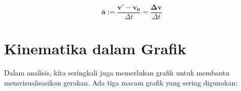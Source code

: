 \documentclass[12pt, a4paper]{article}\usepackage[utf8]{inputenc}
\theoremstyle{plain}
\theoremstyle{plain}
\numberwithin{equation}{section}
\theoremstyle{definition}
\begin{document}
	\begin{equation}
		\boldsymbol{\overline{a}} := \frac{\boldsymbol{v'} - \boldsymbol{v_0}}{\Delta t} = \frac{\boldsymbol{\Delta v}}{\Delta t}
	\end{equation}
	
	\section{Kinematika dalam Grafik}
	
	Dalam analisis, kita seringkali juga memerlukan grafik untuk membantu memvisualisasikan gerakan. Ada tiga macam grafik yang sering digunakan:
	
	\begin{center}
		\begin{figure}[htb]
			\centering
			
			\begin{tikzpicture}[x=0.75pt,y=0.75pt,yscale=-1,xscale=1]
				

\end{tikzpicture}
\end{figure}
\end{center}
\end{document}
